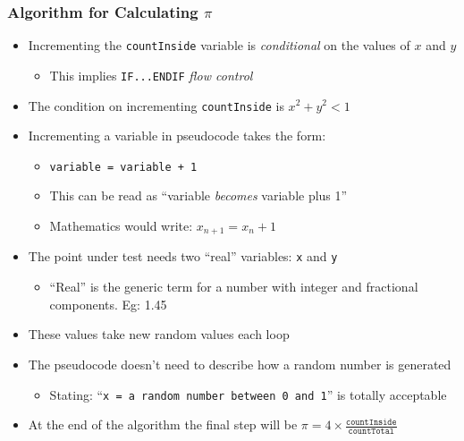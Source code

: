\documentclass[14pt]{beamer}
\begin{document}
\begin{frame}
\frametitle{Algorithm for Calculating $\pi$}
\begin{itemize}
\item Incrementing the \texttt{countInside} variable is \textit{conditional} on the values of $x$ and $y$
	\begin{itemize}
		\item This implies \texttt{IF...ENDIF} \textit{flow control}
	\end{itemize}
\item The condition on incrementing \texttt{countInside} is $x^2 + y^2 < 1$
\item Incrementing a variable in pseudocode takes the form:
	\begin{itemize}
		\item \texttt{variable = variable + 1}
		\item This can be read as ``variable \textit{becomes} variable plus 1''
		\item Mathematics would write: $x_{n+1} = x_n + 1$
	\end{itemize}
\end{itemize}
\end{frame}

\begin{frame}
\begin{itemize}
\item The point under test needs two ``real'' variables: \texttt{x} and \texttt{y}
	\begin{itemize}
 		\item ``Real'' is the generic term for a number with integer and fractional components. Eg: 1.45
	\end{itemize}
\item These values take new random values each loop
\item The pseudocode doesn't need to describe how a random number is generated
	\begin{itemize}
		\item Stating: ``\texttt{x = a random number between 0 and 1}'' is totally acceptable
	\end{itemize}
\item At the end of the algorithm the final step will be $\pi = 4\times \frac{\texttt{countInside}}{\texttt{countTotal}}$
\end{itemize}
\end{frame}
\end{document}
